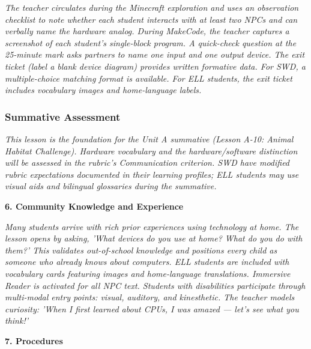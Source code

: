 \documentclass[11pt,letterpaper]{article}
\begin{document}
\textit{The teacher circulates during the Minecraft exploration and uses an observation checklist to note whether each student interacts with at least two NPCs and can verbally name the hardware analog. During MakeCode, the teacher captures a screenshot of each student's single-block program. A quick-check question at the 25-minute mark asks partners to name one input and one output device. The exit ticket (label a blank device diagram) provides written formative data. For SWD, a multiple-choice matching format is available. For ELL students, the exit ticket includes vocabulary images and home-language labels.}

\subsubsection{Summative Assessment}

\textit{This lesson is the foundation for the Unit A summative (Lesson A-10: Animal Habitat Challenge). Hardware vocabulary and the hardware/software distinction will be assessed in the rubric's Communication criterion. SWD have modified rubric expectations documented in their learning profiles; ELL students may use visual aids and bilingual glossaries during the summative.}

\textbf{6. Community Knowledge and Experience}

\textit{Many students arrive with rich prior experiences using technology at home. The lesson opens by asking, 'What devices do you use at home? What do you do with them?' This validates out-of-school knowledge and positions every child as someone who already knows about computers. ELL students are included with vocabulary cards featuring images and home-language translations. Immersive Reader is activated for all NPC text. Students with disabilities participate through multi-modal entry points: visual, auditory, and kinesthetic. The teacher models curiosity: 'When I first learned about CPUs, I was amazed --- let's see what you think!'}

\newpage
\textbf{7. Procedures}
\end{document}
